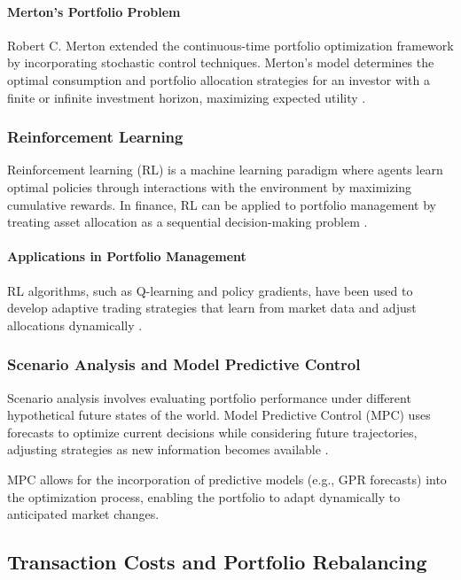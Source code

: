 \paragraph{Merton's Portfolio Problem}

Robert C. Merton extended the continuous-time portfolio optimization framework by incorporating stochastic control techniques. Merton's model determines the optimal consumption and portfolio allocation strategies for an investor with a finite or infinite investment horizon, maximizing expected utility \cite{merton1971optimum}.

\subsubsection{Reinforcement Learning}

Reinforcement learning (RL) is a machine learning paradigm where agents learn optimal policies through interactions with the environment by maximizing cumulative rewards. In finance, RL can be applied to portfolio management by treating asset allocation as a sequential decision-making problem \cite{moody1998performance}.

\paragraph{Applications in Portfolio Management}

RL algorithms, such as Q-learning and policy gradients, have been used to develop adaptive trading strategies that learn from market data and adjust allocations dynamically \cite{almahdi2019adaptive}.

\subsubsection{Scenario Analysis and Model Predictive Control}

Scenario analysis involves evaluating portfolio performance under different hypothetical future states of the world. Model Predictive Control (MPC) uses forecasts to optimize current decisions while considering future trajectories, adjusting strategies as new information becomes available \cite{primbs2009dynamic}.


MPC allows for the incorporation of predictive models (e.g., \ac{GPR} forecasts) into the optimization process, enabling the portfolio to adapt dynamically to anticipated market changes.

\subsection{Transaction Costs and Portfolio Rebalancing}

